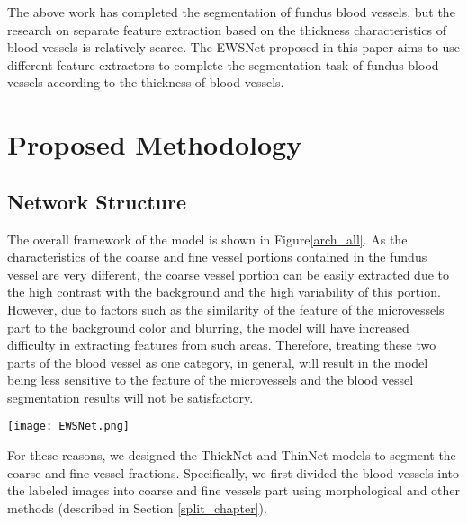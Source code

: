 \documentclass[a4paper,fleqn]{cas-dc}
\begin{document}
The above work has completed the segmentation of fundus blood vessels, but the research on separate feature extraction based on the thickness characteristics of blood vessels is relatively scarce. The EWSNet proposed in this paper aims to use different feature extractors to complete the segmentation task of fundus blood vessels according to the thickness of blood vessels.

\section{Proposed Methodology}
 

\subsection{Network Structure}\label{allmodel}
The overall framework of the  model is shown in Figure\ref{arch_all}. As the characteristics of the coarse and fine vessel portions contained in the fundus vessel are very different, the coarse vessel portion can be easily extracted due to the high contrast with the background and the high variability of this portion. However, due to factors such as the similarity of the feature of the microvessels part to the background color and blurring, the model will have increased difficulty in extracting features from such areas. Therefore, treating these two parts of the blood vessel as one category, in general, will result in the model being less sensitive to the feature of the microvessels and the blood vessel segmentation results will not be satisfactory.

\begin{figure*}[ht!]
	\centering\texttt{[image: EWSNet.png]}
	\caption{The structure of the EWSNet model.}
	\label{arch_all}
\end{figure*}

For these reasons, we designed the ThickNet and ThinNet models to segment the coarse and fine vessel fractions. Specifically, we first divided the blood vessels into the labeled images into coarse and fine vessels part using morphological and other methods (described in Section \ref{split_chapter}). 
\end{document}
